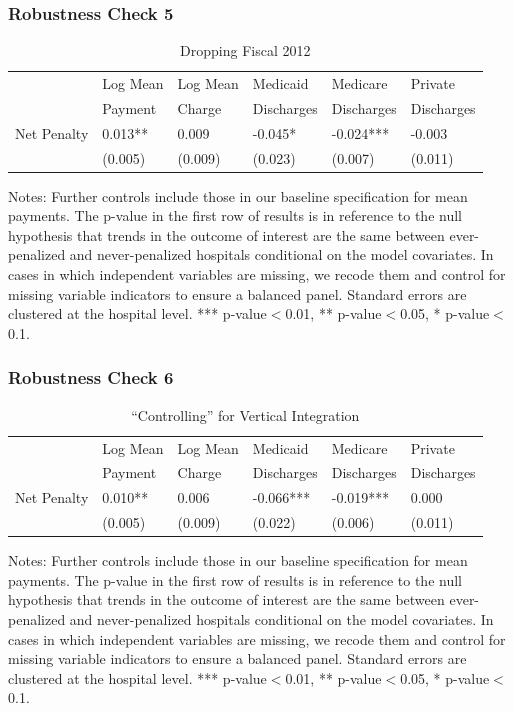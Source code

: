 \documentclass[ucs,9pt]{beamer}
\begin{document}
\begin{frame}
\frametitle{Robustness Check 5}
\begin{table}[htp]
\centering \normalsize
\caption{Dropping Fiscal 2012}
\footnotesize
\begin{tabular}{llllll}
\hline	
\hline
 			& Log Mean 		& Log Mean	& Medicaid 	   	& Medicare   		& Private  			\\
			& Payment		& 	Charge	& Discharges      	& Discharges       	& Discharges    \\
\hline											
Net Penalty 	&	0.013**	&	0.009	&	-0.045*	&	-0.024***	&	-0.003	\\
		&(0.005)	&	(0.009)		&(0.023)		&(0.007)	&	(0.011)	\\
\end{tabular}
\end{table}
\tiny Notes: Further controls include those in our baseline specification for mean payments.  The p-value in the first row of results is in reference to the null hypothesis that trends in the outcome of interest are the same between ever-penalized and never-penalized hospitals conditional on the model covariates.  In cases in which independent variables are missing, we recode them and control for missing variable indicators to ensure a balanced panel.  Standard errors are clustered at the hospital level.  *** p-value$<$0.01, ** p-value$<$0.05, * p-value$<$0.1.
\end{frame}


\begin{frame}
\frametitle{Robustness Check 6}
\begin{table}[htp]
\centering \normalsize
\caption{``Controlling'' for Vertical Integration}
\footnotesize
\begin{tabular}{llllll}
\hline	
\hline
 			& Log Mean 		& Log Mean	& Medicaid 	   	& Medicare   		& Private  			\\
			& Payment		& 	Charge	& Discharges      	& Discharges       	& Discharges    \\
\hline											
Net Penalty	&	0.010**	&	0.006	&	-0.066***	&	-0.019***	&	0.000	\\
			&	(0.005)	&	(0.009)	&	(0.022)	&	(0.006)	&	(0.011)	\\
\end{tabular}
\end{table}
\tiny Notes: Further controls include those in our baseline specification for mean payments.  The p-value in the first row of results is in reference to the null hypothesis that trends in the outcome of interest are the same between ever-penalized and never-penalized hospitals conditional on the model covariates.  In cases in which independent variables are missing, we recode them and control for missing variable indicators to ensure a balanced panel.  Standard errors are clustered at the hospital level.  *** p-value$<$0.01, ** p-value$<$0.05, * p-value$<$0.1.
\end{frame}
\end{document}

